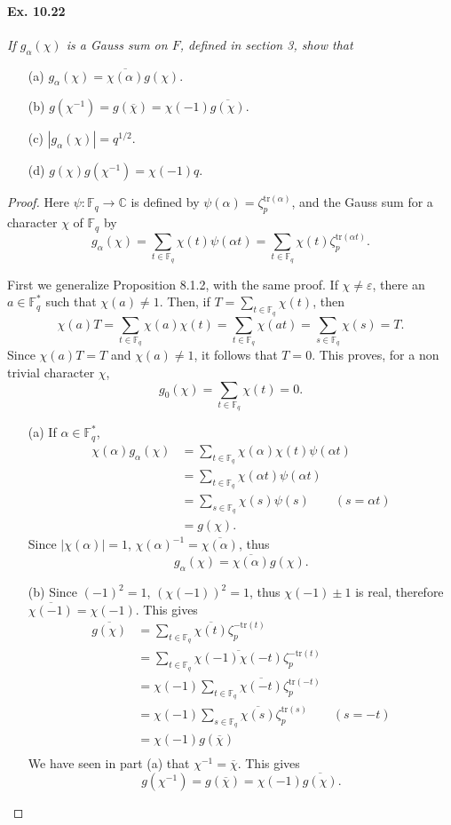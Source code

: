 \documentclass[11pt,a4paper]{article}
\newcommand{\C}{\mathbb{C}}
\newcommand{\F}{\mathbb{F}}
\begin{document}
\paragraph{Ex. 10.22} {\it If $g_\alpha(\chi)$ is a Gauss sum on $F$, defined in section 3, show that
\begin{enumerate}
\item[(a)] $g_\alpha(\chi) = \overline{\chi(\alpha)} g(\chi)$.
\item[(b)] $g(\chi^{-1}) = g(\overline{\chi}) = \chi(-1) \overline{g(\chi)}.$
\item[(c)] $|g_\alpha(\chi) | = q^{1/2}$.
\item[(d)] $g(\chi) g(\chi^{-1}) = \chi(-1) q$.
\end{enumerate}
}
\begin{proof}
Here $\psi : \F_q \to \C$ is defined by $\psi(\alpha) = \zeta_p^{\mathrm{tr}(\alpha)}$, and the Gauss sum for a character $\chi$ of $\F_q$ by
$$g_\alpha(\chi) = \sum_{t \in \F_q} \chi(t) \psi(\alpha t) = \sum_{t \in \F_q} \chi(t) \zeta_p^{\mathrm{tr}(\alpha t)}.$$

First we generalize Proposition 8.1.2, with the same proof.
If $\chi \ne \varepsilon$, there an $a \in \F_q^*$ such that $\chi(a) \ne 1$. Then, if $T = \sum_{t\in \F_q} \chi(t)$, then
$$\chi(a) T = \sum_{t\in \F_q} \chi(a) \chi(t) = \sum_{t\in \F_q} \chi(at) = \sum_{s \in \F_q} \chi(s) = T.$$
Since $\chi(a) T = T$ and $\chi(a) \ne 1$, it follows that $T=0$. This proves, for a non trivial character $\chi$,
$$g_0(\chi) =\sum_{t\in \F_q} \chi(t) = 0.$$
\begin{enumerate}
\item[(a)] 
If $\alpha \in \F_q^*$,
\begin{align*}
\chi(\alpha) g_\alpha(\chi) &=\sum_{t \in \F_q} \chi(\alpha)\chi(t) \psi(\alpha t)\\
&=\sum_{t \in \F_q} \chi(\alpha t) \psi(\alpha t)\\
&= \sum_{s \in \F_q} \chi(s) \psi( s)\qquad (s =\alpha t)\\
&= g(\chi).
\end{align*}
Since $|\chi(\alpha)| = 1$, $\chi(\alpha)^{-1} = \overline{\chi(\alpha)}$, thus
$$g_\alpha(\chi) = \overline{\chi(\alpha)} g(\chi).$$

\item[(b)] Since $(-1)^2 = 1$, $(\chi(-1))^2 = 1$, thus $\chi(-1) \pm 1$ is real, therefore $\overline{\chi(-1)} = \chi(-1)$. This gives
\begin{align*}
\overline{g(\chi)} &= \sum_{t \in \F_q} \overline{\chi(t)} \zeta_p^{-\mathrm{tr}( t)}\\
&=\sum_{t \in \F_q} \overline{\chi(-1) \chi(-t)}  \zeta_p^{-\mathrm{tr}( t)}\\
&=\chi(-1) \sum_{t \in \F_q} \overline{ \chi(-t)}  \zeta_p^{\mathrm{tr}( -t)}\\
&=\chi(-1) \sum_{s \in \F_q} \overline{ \chi(s)}  \zeta_p^{\mathrm{tr}( s)}\qquad (s = -t)\\
&=\chi(-1) g(\overline{\chi})\\
\end{align*}
We have seen in part (a) that $\chi^{-1} = \overline{\chi}$. This gives
$$g(\chi^{-1}) = g(\overline{\chi}) = \chi(-1) \overline{g(\chi)}.$$


\end{enumerate}
\end{proof}
\end{document}
